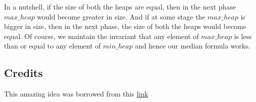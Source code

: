\documentclass[12pt]{article}
\begin{document}
\noindent
In a nutshell, if the size of both the heaps are equal, then in the next phase $max\_heap$ would become greater in size. And if at some stage the $max\_heap$ is bigger in size, then in the next phase, the size of both the heaps would become equal. Of course, we maintain the invariant that any element of $max\_heap$ is less than or equal to any element of $min\_heap$ and hence our median formula works.

\subsection*{Credits}
This amazing idea was borrowed from this \href{https://leetcode.com/problems/find-median-from-data-stream/discuss/74049/Share-my-java-solution-logn-to-insert-O(1)-to-query}{link}
\end{document}
